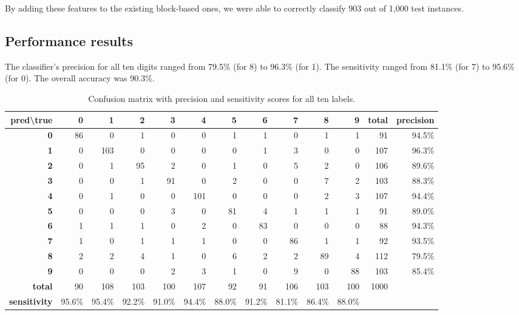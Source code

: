 \documentclass[11pt]{article}
\begin{document}
By adding these features to the existing block-based ones, we were able to correctly
classify 903 out of 1,000 test instances.

\subsection{Performance results}

The classifier's precision for all ten digits ranged from 79.5\% (for 8) to 96.3\% (for 1).
The sensitivity ranged from 81.1\% (for 7) to 95.6\% (for 0). The overall accuracy was 90.3\%.

\begin{table}[h!]
\centering
\setlength\tabcolsep{4pt}
\hspace*{-0.9cm}
\begin{tabular}{| r | r | r | r | r | r | r | r | r | r | r | r | r |}
\hline
\textbf{pred\textbackslash true} & \textbf{0} & \textbf{1} & \textbf{2} & \textbf{3} & \textbf{4} & \textbf{5} & \textbf{6} & \textbf{7} & \textbf{8} & \textbf{9} & \textbf{total} & \textbf{precision} \\
\hline
\textbf{0} & 86 & 0 & 1 & 0 & 0 & 1 & 1 & 0 & 1 & 1 & 91 & 94.5\% \\
\hline
\textbf{1} & 0 & 103 & 0 & 0 & 0 & 0 & 1 & 3 & 0 & 0 & 107 & 96.3\% \\
\hline
\textbf{2} & 0 & 1 & 95 & 2 & 0 & 1 & 0 & 5 & 2 & 0 & 106 & 89.6\% \\
\hline
\textbf{3} & 0 & 0 & 1 & 91 & 0 & 2 & 0 & 0 & 7 & 2 & 103 & 88.3\% \\
\hline
\textbf{4} & 0 & 1 & 0 & 0 & 101 & 0 & 0 & 0 & 2 & 3 & 107 & 94.4\% \\
\hline
\textbf{5} & 0 & 0 & 0 & 3 & 0 & 81 & 4 & 1 & 1 & 1 & 91 & 89.0\% \\
\hline
\textbf{6} & 1 & 1 & 1 & 0 & 2 & 0 & 83 & 0 & 0 & 0 & 88 & 94.3\% \\
\hline
\textbf{7} & 1 & 0 & 1 & 1 & 1 & 0 & 0 & 86 & 1 & 1 & 92 & 93.5\% \\
\hline
\textbf{8} & 2 & 2 & 4 & 1 & 0 & 6 & 2 & 2 & 89 & 4 & 112 & 79.5\% \\
\hline
\textbf{9} & 0 & 0 & 0 & 2 & 3 & 1 & 0 & 9 & 0 & 88 & 103 & 85.4\% \\
\hline
\textbf{total} & 90 & 108 & 103 & 100 & 107 & 92 & 91 & 106 & 103 & 100 & 1000 & \\
\hline
\textbf{sensitivity} & 95.6\% & 95.4\% & 92.2\% & 91.0\% & 94.4\% & 88.0\% & 91.2\% & 81.1\% & 86.4\% & 88.0\% & & \\
\hline
\end{tabular}
\caption{Confusion matrix with precision and sensitivity scores for all ten labels.}
\label{nbc_confusion_matix}
\end{table}
\end{document}
